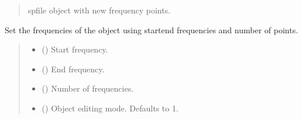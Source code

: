 \documentclass[letterpaper,10pt,english]{sphinxmanual}
\begin{document}
\begin{fulllineitems}
\begin{fulllineitems}
\begin{quote}
\begin{description}
\begin{itemize}
\end{itemize}

\sphinxAtStartPar
spfile object with new frequency points.

\sphinxAtStartPar
{\hyperref[\detokenize{touchstone:touchstone.spfile}]{}}

\end{description}\end{quote}

\end{fulllineitems}


\begin{fulllineitems}
\label{\detokenize{touchstone:touchstone.spfile.set_frequency_points_array}}
\pysigstartsignatures
{}
\pysigstopsignatures
\sphinxAtStartPar
Set the frequencies of the object using start\sphinxhyphen{}end frequencies and number of points.
\begin{quote}\begin{description}
\begin{itemize}
\item {} 
\sphinxAtStartPar
{} (\sphinxstyleliteralemphasis{\sphinxupquote{{[}}}\sphinxstyleliteralemphasis{\sphinxupquote{{]}}}) \textendash{} Start frequency.

\item {} 
\sphinxAtStartPar
{} (\sphinxstyleliteralemphasis{\sphinxupquote{{[}}}\sphinxstyleliteralemphasis{\sphinxupquote{{]}}}) \textendash{} End frequency.

\item {} 
\sphinxAtStartPar
{} () \textendash{} Number of frequencies.

\item {} 
\sphinxAtStartPar
{} (\sphinxstyleliteralemphasis{\sphinxupquote{, }}) \textendash{} Object editing mode. Defaults to \sphinxhyphen{}1.


\end{itemize}
\end{description}
\end{quote}
\end{fulllineitems}
\end{fulllineitems}
\end{document}
